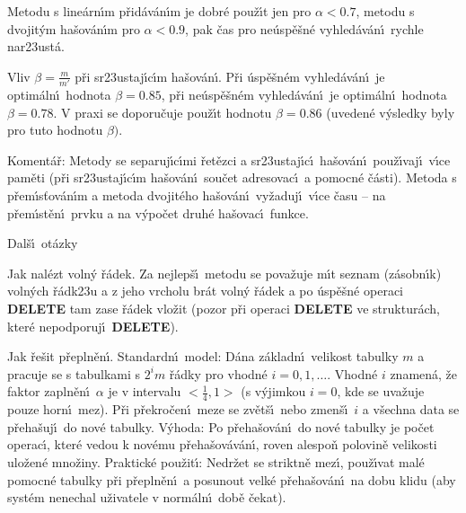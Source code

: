 \documentclass[a4paper,12pt]{article}
\begin{document}
\flushpar Metodu s line\'arn\'\i m p\v rid\'av\'an\'\i m je dobr\'e pou\v z\'\i t jen pro 
$\alpha <0.7$, metodu s dvojit\'ym ha\v sov\'an\'\i m pro $\alpha 
<0.9$, pak 
\v cas pro ne\'usp\v e\v sn\'e vyhled\'av\'an\'\i\ rychle nar\accent23ust\'a.
\medskip

\flushpar Vliv $\beta =\frac m{m'}$ p\v ri sr\accent23ustaj\'\i c\'\i m ha\v sov\'an\'\i .\newline 
P\v ri 
\'usp\v e\v sn\'em vy\-hled\'av\'an\'\i\ je optim\'aln\'\i\ hodnota $
\beta =0.85$, p\v ri 
ne\'usp\v e\v sn\'em vy\-hled\'av\'an\'\i\ je optim\'aln\'\i\ hodnota $
\beta =0.78$. 
V praxi se doporu\v cuje pou\v z\'\i t hodnotu $\beta =0.86$ (uveden\'e 
v\'ysledky byly pro tuto hodnotu $\beta ).$
\medskip

\flushpar Koment\'a\v r: Metody se separuj\'\i c\'\i mi \v ret\v ezci a 
sr\accent23ustaj\'\i c\'\i\ ha\v sov\'an\'\i\ pou\v z\'\i vaj\'\i\ v\'\i ce pam\v eti (p\v ri 
sr\accent23ustaj\'\i c\'\i m ha\v sov\'an\'\i\ sou\v cet adresovac\'\i\ a 
pomocn\'e \v c\'asti). Metoda s p\v rem\'\i s\v tov\'an\'\i m a metoda 
dvojit\'eho ha\v sov\'an\'\i\ vy\v zaduj\'\i\ v\'\i ce \v casu -- na p\v rem\'\i st\v en\'\i\ 
prvku a na v\'ypo\v cet druh\'e ha\v sovac\'\i\ funkce.

\heading
Dal\v s\'\i\ ot\'azky
\endheading

\flushpar Jak nal\'ezt voln\'y \v r\'adek.\newline 
Za nejlep\v s\'\i\ metodu se pova\v zuje m\'\i t seznam (z\'asobn\'\i k) 
voln\'ych \v r\'adk\accent23u a z jeho vrcholu br\'at voln\'y \v r\'adek 
a po \'usp\v e\v sn\'e operaci {\bf DELETE} tam zase \v r\'adek vlo\v zit 
(pozor p\v ri operaci {\bf DELETE} ve struktur\'ach, kter\'e 
nepodporuj\'\i\ {\bf DELETE}).
\medskip

\flushpar Jak \v re\v sit p\v repln\v en\'\i .\newline 
Standardn\'\i\ model: D\'ana z\'akladn\'\i\ velikost tabulky $m$ a 
pracuje se s tabulkami s $2^im$ \v r\'adky pro vhodn\'e 
$i=0,1,\dots$. Vhodn\'e $i$ znamen\'a, \v ze faktor zapln\v en\'\i\ $
\alpha$ je v 
intervalu $<\frac 14,1>$ (s v\'yjimkou $i=0$, kde se uva\v zuje 
pouze horn\'\i\ mez). P\v ri p\v rekro\-\v ce\-n\'\i\ meze se zv\v et\v s\'\i\ nebo 
zmen\v s\'\i\ $i$ a v\v sechna data se p\v reha\v suj\'\i\ do nov\'e 
tabulky.\newline 
V\'yhoda: Po p\v reha\v sov\'an\'\i\ do nov\'e tabulky je po\v cet operac\'\i , 
kter\'e vedou k nov\'emu p\v reha\v sov\'a\-v\'a\-n\'\i , roven alespo\v n polovin\v e 
velikosti ulo\v zen\'e mno\v ziny.\newline 
Praktick\'e pou\v zit\'\i : Nedr\v zet se striktn\v e mez\'\i , pou\v z\'\i vat 
mal\'e pomocn\'e ta\-bul\-ky p\v ri p\v repln\v en\'\i\ a posunout velk\'e 
p\v reha\v sov\'an\'\i\ na dobu klidu (aby syst\'em nenechal u\v zivatele v 
norm\'aln\'\i\ dob\v e \v cekat).
\medskip
\end{document}
